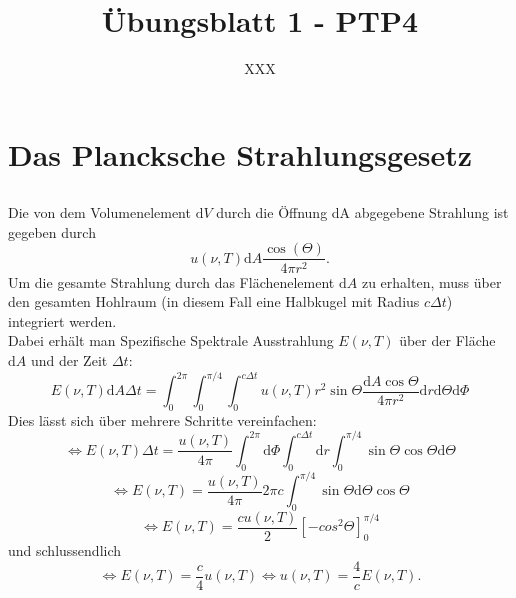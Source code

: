 \documentclass[a4paper,11pt]{article}
\title{Übungsblatt 1 - PTP4}
\author{XXX}
\begin{document}
\maketitle

\section{Das Plancksche Strahlungsgesetz}

\subsection{}
Die von dem Volumenelement $\text{d}V$ durch die Öffnung dA abgegebene Strahlung ist gegeben durch 
\begin{equation}
    u(\nu, T)\text{d}A \frac{\cos(\Theta)}{4\pi r^2}.
\end{equation}
Um die gesamte Strahlung durch das Flächenelement $\text{d}A$ zu erhalten, muss über den gesamten Hohlraum (in diesem Fall eine Halbkugel mit Radius $c\Delta t$) integriert werden.\\
Dabei erhält man Speziﬁsche Spektrale Ausstrahlung $E(\nu, T)$ über der Fläche $\text{d}A$ und der Zeit $\Delta t$:
\begin{equation}
    E(\nu, T)\text{d}A\Delta t = \int_{0}^{2\pi}\int_{0}^{\pi/4}\int_{0}^{c\Delta t} u(\nu, T) r^2 \sin\Theta \frac{\text{d}A \cos\Theta}{4\pi r^2} \text{d}r \text{d}\Theta \text{d}\Phi
\end{equation}
Dies lässt sich über mehrere Schritte vereinfachen:
\begin{equation}
    \Leftrightarrow E(\nu, T)\Delta t = \frac{u(\nu, T)}{4\pi}\int_{0}^{2\pi}\text{d}\Phi\int_{0}^{c\Delta t} \text{d}r \int_{0}^{\pi/4} \sin\Theta \cos\Theta \text{d}\Theta
\end{equation}
\begin{equation}
    \Leftrightarrow E(\nu, T) = \frac{u(\nu, T)}{4\pi}2\pi c\int_{0}^{\pi/4} \sin\Theta \text{d}\Theta \cos\Theta
\end{equation}
\begin{equation}
    \Leftrightarrow E(\nu, T) = \frac{cu(\nu, T)}{2}[-cos^2\Theta]_{0}^{\pi/4}
\end{equation}
und schlussendlich
\begin{equation}
    \Leftrightarrow E(\nu, T) = \frac{c}{4} u(\nu, T) \Leftrightarrow u(\nu, T) = \frac{4}{c}E(\nu, T).
\end{equation}

\subsection{}
\end{document}
